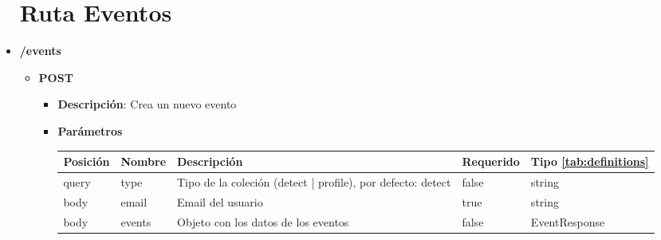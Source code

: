 \begin{itemize}
\section{Ruta Eventos}
\item \textbf{/events}
            \begin{itemize} 
                \item \textbf{POST} 
                    \begin{itemize} 
                        \item \textbf{Descripción}: Crea un nuevo evento
                    
                        \item \textbf{Parámetros}
                        \begin{table}[h]
                            \centering
                                \begin{tabular}{ l l p{5cm} l l } 
                                    \toprule 
                                    Posición & Nombre & Descripción & Requerido & Tipo \ref{tab:definitions} \\ 
                                    \midrule
                                    query & type & Tipo de la coleción (detect | profile), por defecto: detect & false & string \\ 
                                    body & email & Email del usuario & true & string \\ 
                                    body & events & Objeto con los datos de los eventos & false & EventResponse \\  
                                    \bottomrule
                                \end{tabular} 
                            \end{table}
                    

\end{itemize}
\end{itemize}
\end{itemize}
